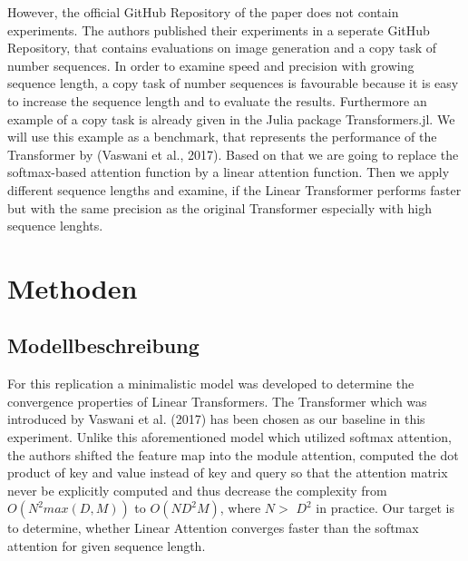 \documentclass[DIV=13,fontsize=11pt]{scrartcl}
\begin{document}
However, the official GitHub Repository of the paper does not contain experiments. The authors published their experiments in a seperate GitHub Repository, that contains evaluations on image generation and a copy task of number sequences.  In order to examine speed and precision with growing sequence length, a copy task of number sequences is favourable because it is easy to increase the sequence length and to evaluate the results. Furthermore an example of a copy task is already given in the Julia package Transformers.jl. We will use this example as a benchmark, that represents the performance of the Transformer by (Vaswani et al., 2017). Based on that we are going to replace the softmax-based attention function by a linear attention function. Then we apply different sequence lengths and examine, if the Linear Transformer performs faster but with the same precision as the original Transformer especially with high sequence lenghts. 


\section{Methoden}


\subsection{Modellbeschreibung}
For this replication a minimalistic model was developed to determine the convergence properties of Linear Transformers. The Transformer which was introduced by Vaswani et al. (2017) has been chosen as our baseline in this experiment. Unlike this aforementioned model which utilized softmax attention, the authors shifted the feature map into the module attention, computed the dot product of key and value instead of key and query so that the attention matrix never be explicitly computed and thus decrease the complexity from \(O(N^2 max(D,M))\) to \(O(ND^2M)\), where \(N >\) \(D^2\) in practice. Our target is to determine, whether Linear Attention converges faster than the softmax attention for given sequence length.  
\end{document}
